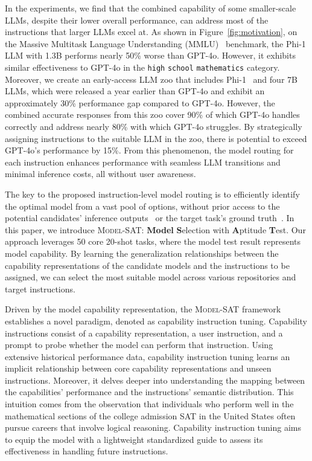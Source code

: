 In the experiments, we find that the combined capability of some smaller-scale LLMs, despite their lower overall performance, can address most of the instructions that larger LLMs excel at. As shown in Figure~\ref{fig:motivation}, on the Massive Multitask Language Understanding (MMLU)~\cite{mmlu} benchmark, the Phi-1 LLM with 1.3B performs nearly 50\% worse than GPT-4o. However, it exhibits similar effectiveness to GPT-4o in the \texttt{high} \texttt{school} \texttt{mathematics} category.
Moreover, we create an early-access LLM zoo that includes Phi-1~\cite{DBLP:journals/corr/abs-2306-11644} and four 7B LLMs, which were released a year earlier than GPT-4o and exhibit an approximately 30\% performance gap compared to GPT-4o.
However, the combined accurate responses from this zoo cover 90\% of which GPT-4o handles correctly and address nearly 80\% with which GPT-4o struggles. By strategically assigning instructions to the suitable LLM in the zoo, there is potential to exceed GPT-4o's performance by 15\%.
From this phenomenon, the model routing for each instruction enhances performance with seamless LLM transitions and minimal inference costs, all without user awareness.

The key to the proposed instruction-level model routing is to efficiently identify the optimal model from a vast pool of options, without prior access to the potential candidates' inference outputs~\cite{DBLP:journals/corr/abs-2311-06720,bge_embedding} or the target task's ground truth~\cite{you2022ranking,DBLP:conf/cvpr/PandyAUFM22}.
In this paper, we introduce \textsc{Model-SAT}: \textbf{Model} \textbf{S}election with \textbf{A}ptitude \textbf{T}est. Our approach leverages 50 core 20-shot tasks, where the model test result represents model capability. By learning the generalization relationships between the capability representations of the candidate models and the instructions to be assigned, we can select the most suitable model across various repositories and target instructions.

Driven by the model capability representation, the \textsc{Model-SAT} framework establishes a novel paradigm, denoted as capability instruction tuning. Capability instructions consist of a capability representation, a user instruction, and a prompt to probe whether the model can perform that instruction. Using extensive historical performance data, capability instruction tuning learns an implicit relationship between core capability representations and unseen instructions. Moreover, it delves deeper into understanding the mapping between the capabilities' performance and the instructions' semantic distribution.
This intuition comes from the observation that individuals who perform well in the mathematical sections of the college admission SAT in the United States often pursue careers that involve logical reasoning. Capability instruction tuning aims to equip the model with a lightweight standardized guide to assess its effectiveness in handling future instructions.

